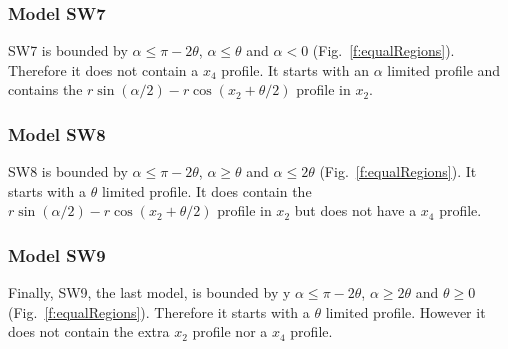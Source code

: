 


\subsubsection{Model SW7} \label{SW7}

SW7 is bounded by $\alpha \le \pi - 2\theta$, $\alpha \le \theta$ and $\alpha < 0$ (Fig.~\ref{f:equalRegions}). Therefore it does not contain a $x_4$ profile. It starts with an $\alpha$ limited profile and contains the $r\sin(\alpha/2) - r\cos(x_2 + \theta/2)$ profile in $x_2$.




\subsubsection{Model SW8} \label{SW8}

SW8 is bounded by $\alpha \le \pi - 2\theta$, $\alpha \ge \theta$ and $\alpha \le 2\theta$ (Fig.~\ref{f:equalRegions}). It starts with a $\theta$ limited profile. It does contain the $r\sin(\alpha/2) - r\cos(x_2 + \theta/2)$ profile in $x_2$ but does not have a $x_4$ profile.

\subsubsection{Model SW9} \label{SW9}

Finally, SW9, the last model, is bounded by y $\alpha \le \pi - 2\theta$, $\alpha \ge 2\theta$ and $\theta \ge 0$ (Fig.~\ref{f:equalRegions}). Therefore it starts with a $\theta$ limited profile. However it does not contain the extra $x_2$ profile nor a $x_4$ profile.








